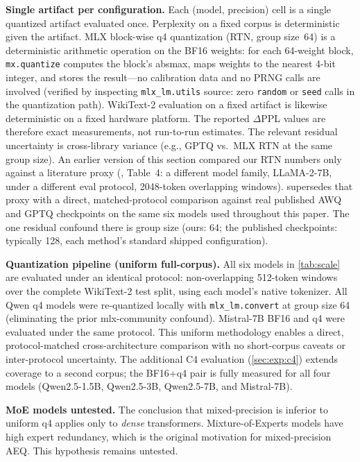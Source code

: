\documentclass[10pt,twocolumn]{article}
\begin{document}
\textbf{Single artifact per configuration.}  Each (model, precision) cell is
a single quantized artifact evaluated once.  Perplexity on a fixed corpus is deterministic given the artifact.
MLX block-wise q4 quantization (RTN, group size~64) is a deterministic
arithmetic operation on the BF16 weights: for each 64-weight block,
\texttt{mx.quantize} computes the block's absmax, maps weights to the nearest
4-bit integer, and stores the result---no calibration data and no PRNG calls
are involved (verified by inspecting \texttt{mlx\_lm.utils} source: zero
\texttt{random} or \texttt{seed} calls in the quantization path).
WikiText-2 evaluation on a fixed artifact is likewise deterministic on a
fixed hardware platform.  The reported $\Delta$PPL values are therefore
exact measurements, not run-to-run estimates.  The relevant residual uncertainty is cross-library variance (e.g., GPTQ
vs.\ MLX RTN at the same group size).  An earlier version of this section compared our RTN numbers only against a
literature proxy (\citealt{lin2023awq}, Table~4: a different model family,
LLaMA-2-7B, under a different eval protocol, 2048-token overlapping windows).
 supersedes that proxy with a direct,
matched-protocol comparison against real published AWQ and GPTQ checkpoints
on the same six models used throughout this paper. The one residual confound
there is group size (ours: 64; the published checkpoints: typically 128,
each method's standard shipped configuration).

\textbf{Quantization pipeline (uniform full-corpus).}  All six models in
\cref{tab:scale} are evaluated under an identical protocol: non-overlapping
512-token windows over the complete WikiText-2 test split, using each model's
native tokenizer.  All Qwen q4 models were re-quantized locally with
\texttt{mlx\_lm.convert} at group size 64 (eliminating the prior mlx-community
confound).  Mistral-7B BF16 and q4 were evaluated under the same protocol.
This uniform methodology enables a direct, protocol-matched cross-architecture
comparison with no short-corpus caveats or inter-protocol uncertainty.
The additional C4 evaluation (\cref{sec:exp:c4}) extends coverage to a
second corpus; the BF16+q4 pair is fully measured for all four models
(Qwen2.5-1.5B, Qwen2.5-3B, Qwen2.5-7B, and Mistral-7B).

\textbf{MoE models untested.}  The conclusion that mixed-precision is inferior
to uniform q4 applies only to \emph{dense} transformers.  Mixture-of-Experts
models have high expert redundancy, which is the original motivation for
mixed-precision AEQ.  This hypothesis remains untested.
\end{document}
